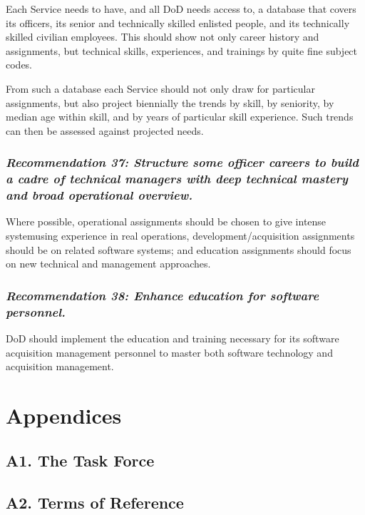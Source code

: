 \documentclass[11pt,final]{article}
\begin{document}
Each Service needs to have, and all DoD needs access to, a database that covers
its officers, its senior and technically skilled enlisted people, and its
technically skilled civilian employees. This should show not only career
history and assignments, but technical skills, experiences, and trainings by
quite fine subject codes.

From such a database each Service should not only draw for particular
assignments, but also project biennially the trends by skill, by seniority, by
median age within skill, and by years of particular skill experience. Such
trends can then be assessed against projected needs.

\label{rec:37}
\subsubsection*{\textit{Recommendation 37: Structure some officer careers to
build a cadre of technical managers with deep technical mastery and broad
operational overview.}}

Where possible, operational assignments should be chosen to give intense
systemusing experience in real operations, development/acquisition assignments
should be on related software systems; and education assignments should focus
on new technical and management approaches.

\label{rec:38}
\subsubsection*{\textit{Recommendation 38: Enhance education for software
personnel.}}

DoD should implement the education and training necessary for its software
acquisition management personnel to master both software technology and
acquisition management.

\newpage
\section{Appendices}

\subsection*{A1. The Task Force}

\subsection*{A2. Terms of Reference}
\end{document}
